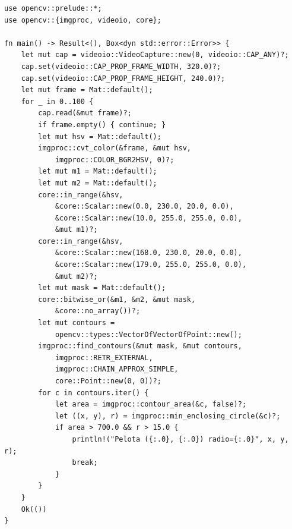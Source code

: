 \documentclass[11pt,a4paper]{article}
\begin{document}
\begin{lstlisting}[style=ruststyle]
use opencv::prelude::*;
use opencv::{imgproc, videoio, core};

fn main() -> Result<(), Box<dyn std::error::Error>> {
    let mut cap = videoio::VideoCapture::new(0, videoio::CAP_ANY)?;
    cap.set(videoio::CAP_PROP_FRAME_WIDTH, 320.0)?;
    cap.set(videoio::CAP_PROP_FRAME_HEIGHT, 240.0)?;
    let mut frame = Mat::default();
    for _ in 0..100 {
        cap.read(&mut frame)?;
        if frame.empty() { continue; }
        let mut hsv = Mat::default();
        imgproc::cvt_color(&frame, &mut hsv,
            imgproc::COLOR_BGR2HSV, 0)?;
        let mut m1 = Mat::default();
        let mut m2 = Mat::default();
        core::in_range(&hsv,
            &core::Scalar::new(0.0, 230.0, 20.0, 0.0),
            &core::Scalar::new(10.0, 255.0, 255.0, 0.0),
            &mut m1)?;
        core::in_range(&hsv,
            &core::Scalar::new(168.0, 230.0, 20.0, 0.0),
            &core::Scalar::new(179.0, 255.0, 255.0, 0.0),
            &mut m2)?;
        let mut mask = Mat::default();
        core::bitwise_or(&m1, &m2, &mut mask,
            &core::no_array())?;
        let mut contours =
            opencv::types::VectorOfVectorOfPoint::new();
        imgproc::find_contours(&mut mask, &mut contours,
            imgproc::RETR_EXTERNAL,
            imgproc::CHAIN_APPROX_SIMPLE,
            core::Point::new(0, 0))?;
        for c in contours.iter() {
            let area = imgproc::contour_area(&c, false)?;
            let ((x, y), r) = imgproc::min_enclosing_circle(&c)?;
            if area > 700.0 && r > 15.0 {
                println!("Pelota ({:.0}, {:.0}) radio={:.0}", x, y, r);
                break;
            }
        }
    }
    Ok(())
}
\end{lstlisting}
\end{document}
